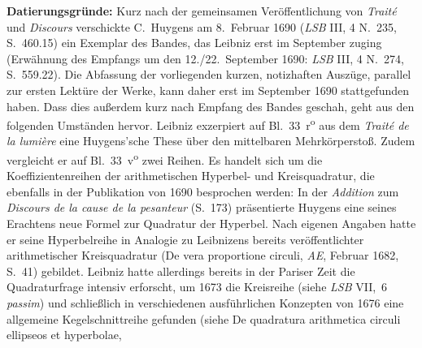 \begin{ledgroup}
\footnotesize
\pstart
\noindent%
\textbf{Datierungsgründe:}
Kurz nach der gemeinsamen Veröffentlichung von \cite{00525}\textit{Traité} und \textit{Discours}
%
verschickte \protect{}C.~Huygens
%
am 8.\ Februar 1690 (\cite{01502}\textit{LSB} III, 4 N.~235, S.~460.15) 
%
ein Exemplar des Bandes, das Leibniz erst im September zuging
%
(Erwähnung des Empfangs um den 12./22.\ September 1690: \cite{02066}\textit{LSB} III, 4 N.~274,
S.~559.22).
%
%
Die Abfassung der vorliegenden kurzen, notizhaften Auszüge, parallel zur ersten Lektüre der Werke, kann daher erst im September 1690 stattgefunden haben.
%
Dass dies außerdem kurz nach Empfang des Bandes geschah, geht aus den folgenden Umständen hervor.
%
\pend
%
\pstart
%
Leibniz exzerpiert auf Bl.~33~r\textsuperscript{o} aus dem \cite{00525}\textit{Traité de la lumière} eine Huygens'sche These über den mittelbaren Mehrkörperstoß. %
%
Zudem vergleicht er auf Bl.~33~v\textsuperscript{o} zwei Reihen. 
%
Es handelt sich um die Koeffizientenreihen der arithmetischen Hyperbel- und Kreisquadratur, die ebenfalls in 
%
der Publikation von 1690 besprochen werden:
%
In der \textit{Addition} zum \cite{00525}\textit{Discours de la cause de la pesanteur} (S.~173)
%
präsentierte \protect{}Huygens 
%
eine seines Erachtens neue Formel zur Quadratur der Hyperbel.
%
Nach eigenen Angaben hatte er seine Hyperbelreihe in Analogie zu Leibnizens bereits veröffentlichter arithmetischer Kreisquadratur 
%
(\cite{02042}\glqq De vera proportione circuli\grqq, \cite{01023}\textit{AE}, Februar 1682, S.~41)
%
gebildet.
%
Leibniz hatte allerdings bereits in der Pariser Zeit die Quadraturfrage intensiv erforscht,
%
um 1673 die Kreisreihe (siehe \textit{LSB} VII,~6 \textit{passim}) 
%
und schließlich in verschiedenen ausführlichen Konzepten von 1676
%
eine allgemeine Kegelschnittreihe gefunden
%
(siehe \cite{01229}\glqq De quadratura arithmetica circuli ellipseos et hyperbolae\grqq, 

\end{ledgroup}
